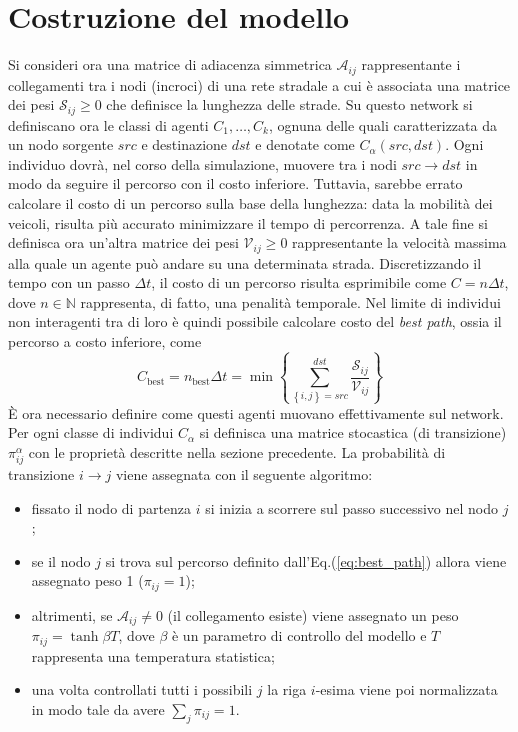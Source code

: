 \documentclass[../main.tex]{subfiles}
\begin{document}
\section{Costruzione del modello}
Si consideri ora una matrice di adiacenza simmetrica $\mathcal{A}_{ij}$ rappresentante i collegamenti tra i nodi (incroci) di una rete stradale a cui \`e associata una matrice dei pesi $\mathcal{S}_{ij} \geq 0$ che definisce la lunghezza delle strade.
Su questo network si definiscano ora le classi di agenti $C_{1},\ldots,C_{k}$, ognuna delle quali caratterizzata da un nodo sorgente $src$ e destinazione $dst$ e denotate come $C_{\alpha}(src,dst)$.
Ogni individuo dovr\`a, nel corso della simulazione, muovere tra i nodi $src\to dst$ in modo da seguire il percorso con il costo inferiore.
Tuttavia, sarebbe errato calcolare il costo di un percorso sulla base della lunghezza: data la mobilit\`a dei veicoli, risulta pi\`u accurato minimizzare il tempo di percorrenza.
A tale fine si definisca ora un'altra matrice dei pesi $\mathcal{V}_{ij} \geq 0$ rappresentante la velocit\`a massima alla quale un agente pu\`o andare su una determinata strada.
Discretizzando il tempo con un passo $\Delta t$, il costo di un percorso risulta esprimibile come $C=n\Delta t$, dove $n \in \mathbb{N}$ rappresenta, di fatto, una penalit\`a temporale.
Nel limite di individui non interagenti tra di loro \`e quindi possibile calcolare costo del \emph{best path}, ossia il percorso a costo inferiore, come
\begin{equation}
    C_{\text{best}} = n_{\text{best}}\Delta t = \min \left\{\sum_{\left\{i,j\right\}=src}^{dst}\frac{\mathcal{S}_{ij}}{\mathcal{V}_{ij}}\right\}
    \label{eq:best_path}
\end{equation}
\`E ora necessario definire come questi agenti muovano effettivamente sul network.
Per ogni classe di individui $C_{\alpha}$ si definisca una matrice stocastica (di transizione) $\pi_{ij}^{\alpha}$ con le propriet\`a descritte nella sezione precedente.
La probabilit\`a di transizione $i\to j$ viene assegnata con il seguente algoritmo:
\begin{itemize}
    \item fissato il nodo di partenza $i$ si inizia a scorrere sul passo successivo nel nodo $j$;
    \item se il nodo $j$ si trova sul percorso definito dall'Eq.(\ref{eq:best_path}) allora viene assegnato peso 1 ($\pi_{ij}=1$);
    \item altrimenti, se $\mathcal{A}_{ij} \neq 0$ (il collegamento esiste) viene assegnato un peso $\pi_{ij}=\tanh \beta T$, dove $\beta$ \`e un parametro di controllo del modello e $T$ rappresenta una temperatura statistica;
    \item una volta controllati tutti i possibili $j$ la riga $i$-esima viene poi normalizzata in modo tale da avere $\sum_j\pi_{ij}=1$.
\end{itemize}
\end{document}
